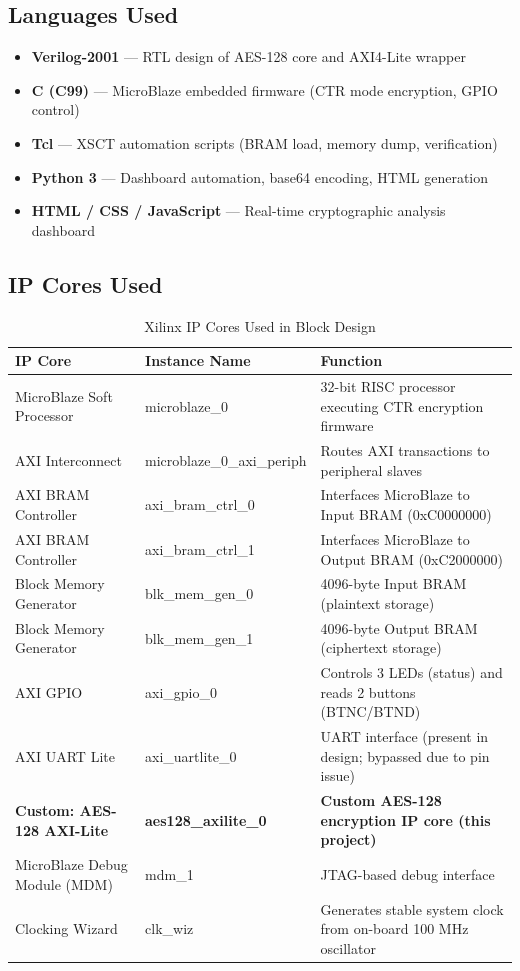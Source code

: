 \documentclass[12pt,a4paper]{article}
\begin{document}
\subsection{Languages Used}

\begin{itemize}[leftmargin=*]
    \item \textbf{Verilog-2001} --- RTL design of AES-128 core and AXI4-Lite wrapper
    \item \textbf{C (C99)} --- MicroBlaze embedded firmware (CTR mode encryption, GPIO control)
    \item \textbf{Tcl} --- XSCT automation scripts (BRAM load, memory dump, verification)
    \item \textbf{Python 3} --- Dashboard automation, base64 encoding, HTML generation
    \item \textbf{HTML / CSS / JavaScript} --- Real-time cryptographic analysis dashboard
\end{itemize}

\subsection{IP Cores Used}

\begin{table}[H]
\centering
\caption{Xilinx IP Cores Used in Block Design}
\begin{tabularx}{\textwidth}{llX}
\toprule
\textbf{IP Core} & \textbf{Instance Name} & \textbf{Function} \\
\midrule
MicroBlaze Soft Processor      & microblaze\_0        & 32-bit RISC processor executing CTR encryption firmware \\
AXI Interconnect               & microblaze\_0\_axi\_periph & Routes AXI transactions to peripheral slaves \\
AXI BRAM Controller            & axi\_bram\_ctrl\_0   & Interfaces MicroBlaze to Input BRAM (0xC0000000) \\
AXI BRAM Controller            & axi\_bram\_ctrl\_1   & Interfaces MicroBlaze to Output BRAM (0xC2000000) \\
Block Memory Generator         & blk\_mem\_gen\_0     & 4096-byte Input BRAM (plaintext storage) \\
Block Memory Generator         & blk\_mem\_gen\_1     & 4096-byte Output BRAM (ciphertext storage) \\
AXI GPIO                       & axi\_gpio\_0         & Controls 3 LEDs (status) and reads 2 buttons (BTNC/BTND) \\
AXI UART Lite                  & axi\_uartlite\_0     & UART interface (present in design; bypassed due to pin issue) \\
\textbf{Custom: AES-128 AXI-Lite}  & \textbf{aes128\_axilite\_0} & \textbf{Custom AES-128 encryption IP core (this project)} \\
MicroBlaze Debug Module (MDM)  & mdm\_1               & JTAG-based debug interface \\
Clocking Wizard                & clk\_wiz             & Generates stable system clock from on-board 100 MHz oscillator \\
\bottomrule
\end{tabularx}
\end{table}
\end{document}
